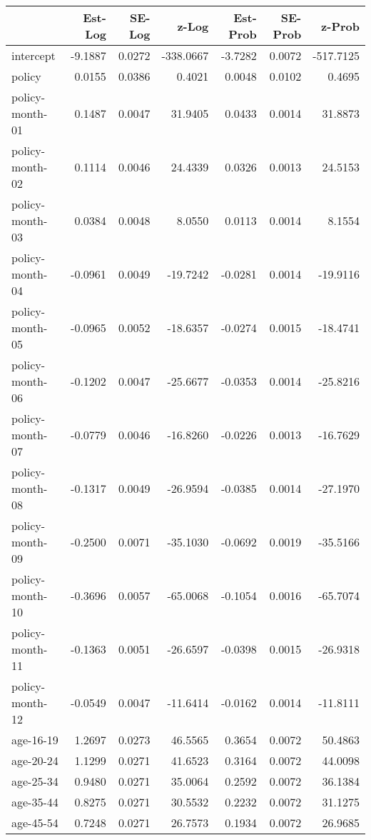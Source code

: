 \documentclass[10pt]{article}
\begin{document}

\begin{table}[ht]
\centering
\begin{tabular}{lrrrrrr}
  \hline
 & Est-Log & SE-Log & z-Log & Est-Prob & SE-Prob & z-Prob \\ 
  \hline
intercept & -9.1887 & 0.0272 & -338.0667 & -3.7282 & 0.0072 & -517.7125 \\ 
  policy & 0.0155 & 0.0386 & 0.4021 & 0.0048 & 0.0102 & 0.4695 \\ 
  policy-month-01 & 0.1487 & 0.0047 & 31.9405 & 0.0433 & 0.0014 & 31.8873 \\ 
  policy-month-02 & 0.1114 & 0.0046 & 24.4339 & 0.0326 & 0.0013 & 24.5153 \\ 
  policy-month-03 & 0.0384 & 0.0048 & 8.0550 & 0.0113 & 0.0014 & 8.1554 \\ 
  policy-month-04 & -0.0961 & 0.0049 & -19.7242 & -0.0281 & 0.0014 & -19.9116 \\ 
  policy-month-05 & -0.0965 & 0.0052 & -18.6357 & -0.0274 & 0.0015 & -18.4741 \\ 
  policy-month-06 & -0.1202 & 0.0047 & -25.6677 & -0.0353 & 0.0014 & -25.8216 \\ 
  policy-month-07 & -0.0779 & 0.0046 & -16.8260 & -0.0226 & 0.0013 & -16.7629 \\ 
  policy-month-08 & -0.1317 & 0.0049 & -26.9594 & -0.0385 & 0.0014 & -27.1970 \\ 
  policy-month-09 & -0.2500 & 0.0071 & -35.1030 & -0.0692 & 0.0019 & -35.5166 \\ 
  policy-month-10 & -0.3696 & 0.0057 & -65.0068 & -0.1054 & 0.0016 & -65.7074 \\ 
  policy-month-11 & -0.1363 & 0.0051 & -26.6597 & -0.0398 & 0.0015 & -26.9318 \\ 
  policy-month-12 & -0.0549 & 0.0047 & -11.6414 & -0.0162 & 0.0014 & -11.8111 \\ 
  age-16-19 & 1.2697 & 0.0273 & 46.5565 & 0.3654 & 0.0072 & 50.4863 \\ 
  age-20-24 & 1.1299 & 0.0271 & 41.6523 & 0.3164 & 0.0072 & 44.0098 \\ 
  age-25-34 & 0.9480 & 0.0271 & 35.0064 & 0.2592 & 0.0072 & 36.1384 \\ 
  age-35-44 & 0.8275 & 0.0271 & 30.5532 & 0.2232 & 0.0072 & 31.1275 \\ 
  age-45-54 & 0.7248 & 0.0271 & 26.7573 & 0.1934 & 0.0072 & 26.9685 \\ 

\end{tabular}
\end{table}
\end{document}

